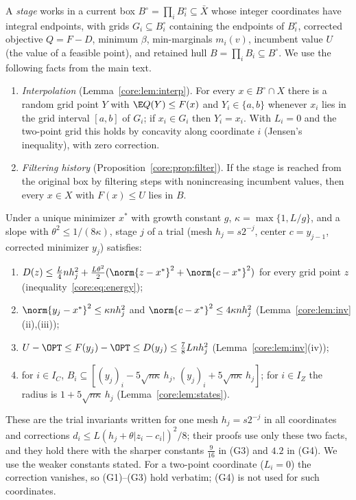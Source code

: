 A \emph{stage} works in a current box $B^\circ=\prod_iB^\circ_i\subseteq\bar X$
whose integer coordinates have integral endpoints, with grids $G_i\subseteq
B^\circ_i$ containing the endpoints of $B^\circ_i$, corrected objective
$Q=F-D$, minimum $\beta$, min-marginals $m_i(v)$, incumbent value $U$ (the
value of a feasible point), and retained hull $B=\prod_iB_i\subseteq B^\circ$.
We use the following facts from the main text.
\begin{enumerate}
\item[(I)] \emph{Interpolation} (Lemma~\ref{core:lem:interp}). For every
$x\in B^\circ\cap X$ there is a random grid point $Y$ with $\E Q(Y)\le F(x)$
and $Y_i\in\{a,b\}$ whenever $x_i$ lies in the grid interval $[a,b]$ of
$G_i$; if $x_i\in G_i$ then $Y_i=x_i$. With $L_i=0$ and the two-point grid this
holds by concavity along coordinate $i$ (Jensen's inequality), with zero
correction.
\item[(F)] \emph{Filtering history} (Proposition~\ref{core:prop:filter}). If the
stage is reached from the original box by filtering steps with nonincreasing
incumbent values, then every $x\in X$ with $F(x)\le U$ lies in $B$.
\end{enumerate}
Under a unique minimizer $x^*$ with growth constant $g$,
$\kappa=\max\{1,L/g\}$, and a slope with $\theta^2\le1/(8\kappa)$, stage $j$
of a trial (mesh $h_j=s2^{-j}$, center $c=y_{j-1}$, corrected minimizer $y_j$)
satisfies:
\begin{enumerate}
\item[(G1)] $D(z)\le\frac L4nh_j^2+\frac{L\theta^2}2(\norm{z-x^*}^2+\norm{c-x^*}^2)$
for every grid point $z$ (inequality~\eqref{core:eq:energy});
\item[(G2)] $\norm{y_j-x^*}^2\le\kappa nh_j^2$ and $\norm{c-x^*}^2\le4\kappa nh_j^2$
(Lemma~\ref{core:lem:inv}(ii),(iii));
\item[(G3)] $U-\OPT\le F(y_j)-\OPT\le D(y_j)\le\frac78Lnh_j^2$
(Lemma~\ref{core:lem:inv}(iv));
\item[(G4)] for $i\in I_C$, $B_i\subseteq[(y_j)_i-5\sqrt{n\kappa}\,h_j,\,
(y_j)_i+5\sqrt{n\kappa}\,h_j]$; for $i\in I_Z$ the radius is
$1+5\sqrt{n\kappa}\,h_j$ (Lemma~\ref{core:lem:states}).
\end{enumerate}
These are the trial invariants written for one mesh $h_j=s2^{-j}$ in all
coordinates and corrections $d_i\le L(h_j+\theta|z_i-c_i|)^2/8$; their
proofs use only these two facts, and they hold there with the sharper
constants $\frac9{16}$ in (G3) and $4.2$ in (G4). We use the weaker
constants stated. For a two-point coordinate ($L_i=0$) the correction
vanishes, so (G1)--(G3) hold verbatim; (G4) is not used for such
coordinates.

